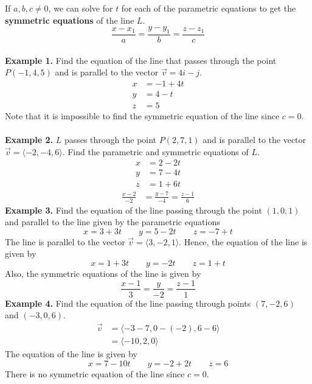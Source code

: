 If $a, b, c \neq 0$, we can solve for $t$ for each of the parametric equations
to get the \textbf{symmetric equations} of the line $L$. \[\frac{x - x_1}{a} = \frac{y - y_1}{b} = \frac{z - z_1}{c}\]
~\\
\noindent\textbf{Example 1. } Find the equation of the line that passes through the point $P(-1, 4, 5)$ and is parallel to the vector $\vec{v} = 4i - j$.
\begin{align*}
    x & = -1 + 4t \\
    y & = 4 - t   \\
    z & = 5
\end{align*}
Note that it is impossible to find the symmetric equation of the line since $c = 0$.
~\\\\
\noindent\textbf{Example 2. } $L$ passes through the point $P(2, 7, 1)$ and is parallel to the vector $\vec{v} = \langle -2, -4, 6 \rangle$. Find the parametric and symmetric equations of $L$.
\begin{align*}
    x & = 2 - 2t \\
    y & = 7 - 4t \\
    z & = 1 + 6t
\end{align*}
\begin{align*}
    \frac{x - 2}{-2} & = \frac{y - 7}{-4} = \frac{z - 1}{6}
\end{align*}
\noindent\textbf{Example 3. } Find the equation of the line passing through the point $(1, 0, 1)$ and parallel to the line given by the parametric equations \[x = 3 + 3t \qquad y = 5 - 2t \qquad z = -7 + t\]
The line is parallel to the vector $\vec{v} = \langle 3, -2, 1 \rangle$. Hence,
the equation of the line is given by \[x = 1 + 3t \qquad y = -2t \qquad z = 1 + t\]
Also, the symmetric equations of the line is given by \[\frac{x - 1}{3} = \frac{y}{-2} = \frac{z - 1}{1}\]
\noindent\textbf{Example 4. } Find the equation of the line passing through points $(7, -2, 6)$ and $(-3, 0, 6)$.
\begin{align*}
    \vec{v} & = \langle -3 - 7, 0 - (-2), 6 - 6 \rangle \\
            & = \langle -10, 2, 0 \rangle
\end{align*}
The equation of the line is given by \[x = 7 - 10t \qquad y = -2 + 2t \qquad z = 6\]
There is no symmetric equation of the line since $c = 0$.

